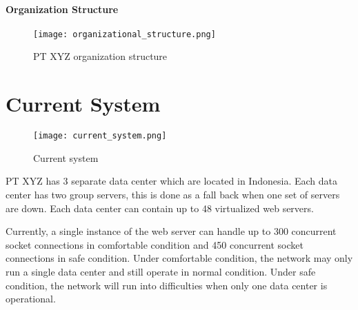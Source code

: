 \paragraph{Organization Structure}
\begin{figure}[H]
\centering
\texttt{[image: organizational\_structure.png]}
\caption{PT XYZ organization structure}
\label{fig:fig331}
\end{figure}

\section{Current System}
\begin{figure}[h]
\centering
\texttt{[image: current\_system.png]}
\caption{Current system}
\label{fig:currsys}
\end{figure}

PT XYZ has 3 separate data center which are located in Indonesia. Each data center has two group servers, this is done as a fall back when one set of servers are down. Each data center can contain up to 48 virtualized web servers.

Currently, a single instance of the web server can handle up to 300 concurrent socket connections in comfortable condition and 450 concurrent socket connections in safe condition. Under comfortable condition, the network may only run a single data center and still operate in normal condition. Under safe condition, the network will run into difficulties when only one data center is operational.

